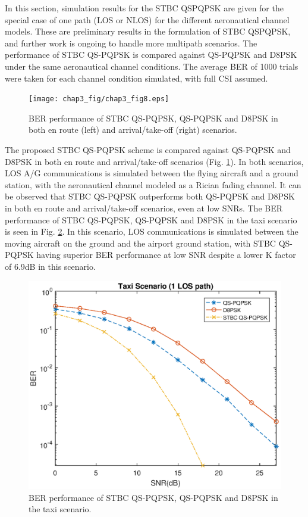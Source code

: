 In this section, simulation results for the STBC QSPQPSK are given for the special case of one path (LOS or NLOS) for the different aeronautical channel models. These are preliminary results in the formulation of STBC QSPQPSK, and further work is ongoing to handle more multipath scenarios. The performance of STBC QS-PQPSK is compared against QS-PQPSK and D8PSK under the same aeronautical channel conditions. The average BER of 1000 trials were taken for each channel condition simulated, with full CSI assumed.

\begin{figure}[]
\centering
\texttt{[image: chap3\_fig/chap3\_fig8.eps]}
\vspace{-2.in}
\caption{BER performance of STBC QS-PQPSK, QS-PQPSK and D8PSK in both en route (left) and arrival/take-off (right) scenarios.}
\label{fig:chap3_fig8}
\end{figure}

The proposed STBC QS-PQPSK scheme is compared against QS-PQPSK and D8PSK in both en route and arrival/take-off scenarios (Fig. \ref{fig:chap3_fig8}). In both scenarios, LOS A/G communications is simulated between the flying aircraft and a ground station, with the aeronautical channel modeled as a Rician fading channel. It can be observed that STBC QS-PQPSK outperforms both QS-PQPSK and D8PSK in both en route and arrival/take-off scenarios, even at low SNRs. The BER performance of STBC QS-PQPSK, QS-PQPSK and D8PSK in the taxi scenario is seen in Fig. \ref{fig:chap3_fig9}. In this scenario, LOS communications is simulated between the moving aircraft on the ground and the airport ground station, with STBC QS-PQPSK having superior BER performance at low SNR despite a lower K factor of 6.9dB in this scenario.

\begin{figure} []
\centering
\includegraphics [width=0.5\columnwidth]{chap3_fig/chap3_fig9.eps} 
\caption{BER performance of STBC QS-PQPSK, QS-PQPSK and D8PSK in the taxi scenario.}
\label{fig:chap3_fig9}
\end{figure}


